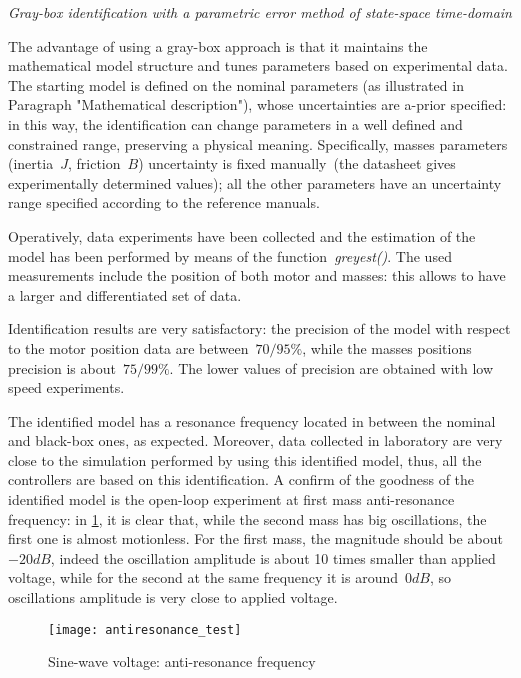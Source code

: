 \textit{Gray-box identification with a parametric error method of state-space time-domain} \\
\par The advantage of using a gray-box approach is that it maintains the mathematical model structure and tunes parameters based on experimental data. The starting model is defined on the nominal parameters (as illustrated in Paragraph "Mathematical description"), whose uncertainties are a-prior specified: in this way, the identification can change parameters in a well defined and constrained range, preserving a physical meaning. Specifically, masses parameters (inertia~$J$, friction~$B$) uncertainty is fixed manually~(the datasheet gives experimentally determined values); all the other parameters have an uncertainty range specified according to the reference manuals.

Operatively, data experiments have been collected and the estimation of the model has been performed by means of the function~\textit{greyest()}. The used measurements include the position of both motor and masses: this allows to have a larger and differentiated set of data.

Identification results are very satisfactory: the precision of the model with respect to the motor position data are between~$70 / 95\%$, while the masses positions precision is about~$75 / 99\%$. The lower values of precision are obtained with low speed experiments.

The identified model has a resonance frequency located in between the nominal and black-box ones, as expected. Moreover, data collected in laboratory are very close to the simulation performed by using this identified model, thus, all the controllers are based on this identification. A confirm of the goodness of the identified model is the open-loop experiment at first mass anti-resonance frequency: in \cref{fig:antiresonance}, it is clear that, while the second mass has big oscillations, the first one is almost motionless. For the first mass, the magnitude should be about~$-20 dB$, indeed the oscillation amplitude is about 10 times smaller than applied voltage, while for the second at the same frequency it is around~$0 dB$, so oscillations amplitude is very close to applied voltage.
\begin{figure}
	\centering
	\texttt{[image: antiresonance\_test]}
	\caption{Sine-wave voltage: anti-resonance frequency}
	\label{fig:antiresonance}
\end{figure}
